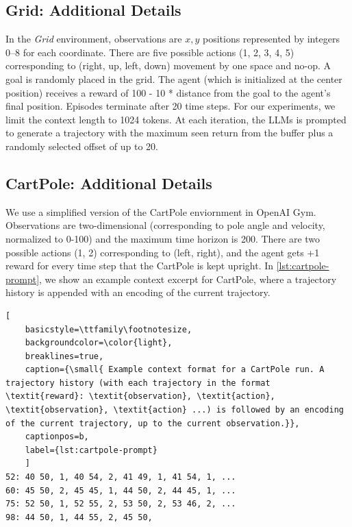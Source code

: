 \subsection{Grid: Additional Details}

In the \textit{Grid} environment, observations are $x, y$ positions represented by integers 0--8 for each coordinate. There are five possible actions (1, 2, 3, 4, 5) corresponding to (right, up, left, down) movement by one space and no-op. A goal is randomly placed in the grid. The agent (which is initialized at the center position) receives a reward of 100 - 10 * distance from the goal to the agent's final position. Episodes terminate after 20 time steps. For our experiments, we limit the context length to 1024 tokens. At each iteration, the LLMs is prompted to generate a trajectory with the maximum seen return from the buffer plus a randomly selected offset of up to 20.



\subsection{CartPole: Additional Details}

We use a simplified version of the CartPole enviornment in OpenAI Gym. Observations are two-dimensional (corresponding to pole angle and velocity, normalized to 0-100) and the maximum time horizon is 200. There are two possible actions (1, 2) corresponding to (left, right), and the agent gets +1 reward for every time step that the CartPole is kept upright. In \cref{lst:cartpole-prompt}, we show an example context excerpt for CartPole, where a trajectory history is appended with an encoding of the current trajectory.

\begin{lstlisting}[
    basicstyle=\ttfamily\footnotesize,
    backgroundcolor=\color{light},
    breaklines=true,
    caption={\small{ Example context format for a CartPole run. A trajectory history (with each trajectory in the format \textit{reward}: \textit{observation}, \textit{action}, \textit{observation}, \textit{action} ...) is followed by an encoding of the current trajectory, up to the current observation.}},
    captionpos=b,
    label={lst:cartpole-prompt}
    ]
52: 40 50, 1, 40 54, 2, 41 49, 1, 41 54, 1, ...
60: 45 50, 2, 45 45, 1, 44 50, 2, 44 45, 1, ...
75: 52 50, 1, 52 55, 2, 53 50, 2, 53 46, 2, ...
98: 44 50, 1, 44 55, 2, 45 50, 
\end{lstlisting}

